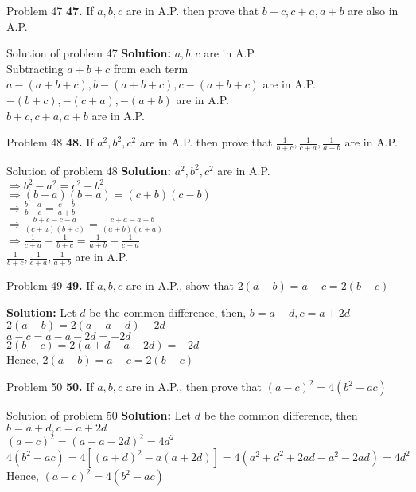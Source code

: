 \documentclass[aspectratio=1610,8pt]{beamer}
\begin{document}
\begin{frame}{Problem 47}
  \textbf{47.} If $a, b, c$ are in A.P. then prove that $b + c, c + a, a + b$
  are also in A.P.
\end{frame}
\begin{frame}{Solution of problem 47}
  \textbf{Solution:} $a, b, c$ are in A.P.\\
  Subtracting $a + b + c$ from each term\\
  $a - (a + b + c), b - (a + b + c), c - (a + b + c)$ are in A.P.\\
  $-(b + c), -(c + a), -(a + b)$ are in A.P.\\
  $b + c, c + a, a + b$ are in A.P.
\end{frame}
\begin{frame}{Problem 48}
  \textbf{48.} If $a^2, b^2, c^2$ are in A.P. then prove that $\frac{1}{b+c},
  \frac{1}{c+a}, \frac{1}{a + b}$ are in A.P.
\end{frame}
\begin{frame}{Solution of problem 48}
  \textbf{Solution:} $a^2, b^2, c^2$ are in A.P.\\
  $\Rightarrow b^2 - a^2 = c^2 - b^2$\\
  $\Rightarrow (b + a)(b - a) = (c + b)(c - b)$\\
  $\Rightarrow \frac{b - a}{b + c} = \frac{c - b}{a + b}$\\
  $\Rightarrow \frac{b + c - c - a}{(c + a)(b + c)} = \frac{c + a - a - b}{(a +
    b)(c + a)}$\\
  $\Rightarrow \frac{1}{c + a} - \frac{1}{b + c} = \frac{1}{a + b} - \frac{1}{c
    + a}$\\
  $\frac{1}{b + c}, \frac{1}{c + a}, \frac{1}{a + b}$ are in A.P.
\end{frame}
\begin{frame}{Problem 49}
  \textbf{49.} If $a, b, c$ are in A.P., show that $2(a - b) = a - c = 2(b - c)$
\end{frame}
\begin{frame}
  \textbf{Solution:} Let $d$ be the common difference, then, $b = a + d, c = a
  + 2d$\\
  $2(a - b) = 2(a - a - d)-2d$\\
  $a - c = a - a - 2d = -2d$\\
  $2(b - c) = 2(a + d - a - 2d) = -2d$\\
  Hence, $2(a - b) = a - c = 2(b - c)$
\end{frame}
\begin{frame}{Problem 50}
  \textbf{50.} If $a, b , c$ are in A.P., then prove that $(a - c)^2 = 4(b^2 - ac)$
\end{frame}
\begin{frame}{Solution of problem 50}
  \textbf{Solution:} Let $d$ be the common difference, then $b = a + d, c = a +
  2d$\\
  $(a - c)^2 = (a - a - 2d)^2 = 4d^2$\\
  $4(b^2 - ac) = 4[(a + d)^2 - a(a + 2d)] = 4(a^2 + d^2 + 2ad - a^2 - 2ad) =
  4d^2$\\
  Hence, $(a - c)^2 = 4(b^2 - ac)$
\end{frame}
\end{document}
